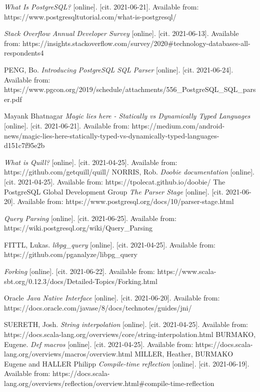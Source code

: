 \documentclass[thesis=B,english]{FITthesis}[2019/12/23]
\begin{document}


\begin{thebibliography}{9}

\textit {What Is PostgreSQL?} [online]. [cit. 2021-06-21]. Available from:
https://www.postgresqltutorial.com/what-is-postgresql/

\textit {Stack Overflow Annual Developer Survey} [online]. [cit. 2021-06-13]. Available from: https://insights.stackoverflow.com/survey/2020\#technology-databases-all-respondents4

PENG, Bo.
\textit {Introducing PostgreSQL SQL Parser} [online]. [cit. 2021-06-24]. Available from:
https://www.pgcon.org/2019/schedule/attachments/556\_PostgreSQL\_SQL\_parser.pdf

Mayank Bhatnagar
\textit {Magic lies here - Statically vs Dynamically Typed Languages} [online]. [cit. 2021-06-21]. Available from: https://medium.com/android-news/magic-lies-here-statically-typed-vs-dynamically-typed-languages-d151c7f95e2b

\textit {What is Quill?} [online]. [cit. 2021-04-25]. Available from: https://github.com/getquill/quill/
NORRIS, Rob. 
\textit {Doobie documentation} [online]. [cit. 2021-04-25]. Available from: https://tpolecat.github.io/doobie/
The PostgreSQL Global Development Group
\textit{The Parser Stage} [online]. [cit. 2021-06-20]. Available from: https://www.postgresql.org/docs/10/parser-stage.html

\textit {Query Parsing} [online]. [cit. 2021-06-25]. Available from:
https://wiki.postgresql.org/wiki/Query\_Parsing

FITTL, Lukas.
\textit {libpg\_query} [online]. [cit. 2021-04-25]. Available from:
https://github.com/pganalyze/libpg\_query

\textit {Forking} [online]. [cit. 2021-06-22]. Available from:
https://www.scala-sbt.org/0.12.3/docs/Detailed-Topics/Forking.html

Oracle
\textit{Java Native Interface} [online]. [cit. 2021-06-20]. Available from:
https://docs.oracle.com/javase/8/docs/technotes/guides/jni/

SUERETH, Josh. 
\textit {String interpolation} [online]. [cit. 2021-04-25]. Available from: https://docs.scala-lang.org/overviews/core/string-interpolation.html
BURMAKO, Eugene. 
\textit {Def macros} [online]. [cit. 2021-04-25]. Available from: https://docs.scala-lang.org/overviews/macros/overview.html
MILLER, Heather, BURMAKO Eugene and HALLER Philipp 
\textit {Compile-time reflection} [online]. [cit. 2021-06-19]. Available from: https://docs.scala-lang.org/overviews/reflection/overview.html\#compile-time-reflection


\end{thebibliography}
\end{document}
